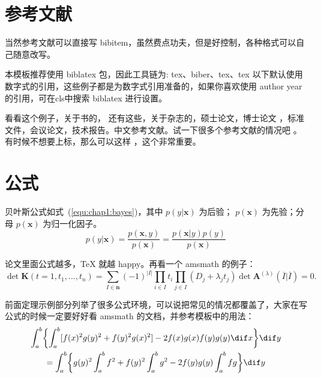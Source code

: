 \documentclass[../Main/thesis.tex]{subfiles}
\begin{document}
\section{参考文献}
\label{sec:bib}
当然参考文献可以直接写 bibitem，虽然费点功夫，但是好控制，各种格式可以自己随意改写。

本模板推荐使用 biblatex 包，因此工具链为: tex、biber、tex、tex 以下默认使用数字式的引用，这些例子都是为数字式引用准备的，如果你喜欢使用 author year 的引用，可在cls中搜索 biblatex 进行设置。

看看这个例子，关于书的\cite{tex, companion,ColdSources}， 还有这些\cite{Krasnogor2004e, clzs, zjsw}，关于杂志的\cite{ELIDRISSI94, MELLINGER96, SHELL02}，硕士论文\cite{zhubajie, metamori2004}，博士论文 \cite{shaheshang, FistSystem01}，标准文件\cite{IEEE-1363}，会议论文\cite{DPMG,kocher99}，技术报告\cite{NPB2}。中文参考文献\cite{cnarticle}。试一下很多个参考文献的情况吧
\cite{BogdanSLOPEAdaptiveVariable2014, GossmannIdentificationsignificantgenetic2015, AlbrechtTopologicalapproachfuzzy1999, AlbrechtTopologicalConceptsHierarchies2001, AlbrechtTopologicaltheoryfuzziness1999, MoriasiModelevaluationguidelines2007, Jdatamodels2003}。
有时候不想要上标，那么可以这样 \parencite{shaheshang}，这个非常重要。%

\section{公式}
\label{sec:equation}
贝叶斯公式如式~(\ref{equ:chap1:bayes})，其中 $p(y|\mathbf{x})$ 为后验；
$p(\mathbf{x})$ 为先验；分母 $p(\mathbf{x})$ 为归一化因子。
\begin{equation}
  \label{equ:chap1:bayes}
  p(y|\mathbf{x}) = \frac{p(\mathbf{x},y)}{p(\mathbf{x})}=
  \frac{p(\mathbf{x}|y)p(y)}{p(\mathbf{x})}
\end{equation}

论文里面公式越多，\TeX{} 就越 happy。再看一个 \textsf{amsmath} 的例子：
\newcommand{\envert}[1]{\left\lvert#1\right\rvert}
\begin{equation}\label{detK2}
  \det\mathbf{K}(t=1,t_1,\dots,t_n)=\sum_{I\in\mathbf{n}}(-1)^{\envert{I}}
  \prod_{i\in I}t_i\prod_{j\in I}(D_j+\lambda_jt_j)\det\mathbf{A}
  ^{(\lambda)}(\overline{I}|\overline{I})=0.
\end{equation}

前面定理示例部分列举了很多公式环境，可以说把常见的情况都覆盖了，大家在写公式的时候一定要好好看 \textsf{amsmath} 的文档，并参考模板中的用法：
\begin{multline*}%
  \int_a^b\biggl\{\int_a^b[f(x)^2g(y)^2+f(y)^2g(x)^2]
  -2f(x)g(x)f(y)g(y)\dif x\biggr\}\dif y \\
  =\int_a^b\biggl\{g(y)^2\int_a^bf^2+f(y)^2
  \int_a^b g^2-2f(y)g(y)\int_a^b fg\biggr\}\dif y
\end{multline*}
\end{document}

